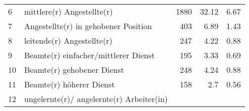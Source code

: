 \begin{longtable}{lXrrr}
     6 &
     \multicolumn{1}{X}{ mittlere(r) Angestellte(r)   } &


       \num{1880} &
       \num[round-mode=places,round-precision=2]{32.12} &
         \num[round-mode=places,round-precision=2]{6.67} \\

     7 &
     \multicolumn{1}{X}{ Angestellte(r) in gehobener Position   } &


       \num{403} &
       \num[round-mode=places,round-precision=2]{6.89} &
         \num[round-mode=places,round-precision=2]{1.43} \\

     8 &
     \multicolumn{1}{X}{ leitende(r) Angestellte(r)   } &


       \num{247} &
       \num[round-mode=places,round-precision=2]{4.22} &
         \num[round-mode=places,round-precision=2]{0.88} \\

     9 &
     \multicolumn{1}{X}{ Beamte(r) einfacher/mittlerer Dienst   } &


       \num{195} &
       \num[round-mode=places,round-precision=2]{3.33} &
         \num[round-mode=places,round-precision=2]{0.69} \\

     10 &
     \multicolumn{1}{X}{ Beamte(r) gehobener Dienst   } &


       \num{248} &
       \num[round-mode=places,round-precision=2]{4.24} &
         \num[round-mode=places,round-precision=2]{0.88} \\

     11 &
     \multicolumn{1}{X}{ Beamte(r) höherer Dienst   } &


       \num{158} &
       \num[round-mode=places,round-precision=2]{2.7} &
         \num[round-mode=places,round-precision=2]{0.56} \\

     12 &
     \multicolumn{1}{X}{ ungelernte(r)/ angelernte(r) Arbeiter(in)   } &



\end{longtable}
